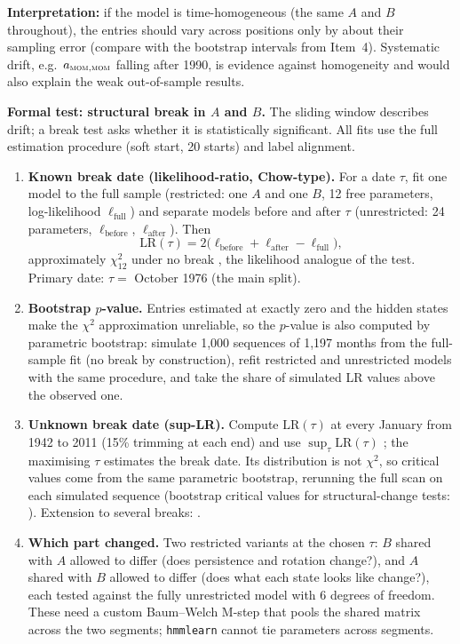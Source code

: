 \documentclass[11pt]{article}
\begin{document}
\textbf{Interpretation:} if the model is time-homogeneous (the same $A$ and $B$ throughout), the entries should vary across positions only by about their sampling error (compare with the bootstrap intervals from Item~4). Systematic drift, e.g.\ $a_{\textsc{mom},\textsc{mom}}$ falling after 1990, is evidence against homogeneity and would also explain the weak out-of-sample results.

\textbf{Formal test: structural break in $A$ and $B$.} The sliding window describes drift; a break test asks whether it is statistically significant. All fits use the full estimation procedure (soft start, 20 starts) and label alignment.
\begin{enumerate}
\item \textbf{Known break date (likelihood-ratio, Chow-type).} For a date $\tau$, fit one model to the full sample (restricted: one $A$ and one $B$, 12 free parameters, log-likelihood $\ell_{\text{full}}$) and separate models before and after $\tau$ (unrestricted: 24 parameters, $\ell_{\text{before}}$, $\ell_{\text{after}}$). Then
\[
\text{LR}(\tau)=2\big(\ell_{\text{before}}+\ell_{\text{after}}-\ell_{\text{full}}\big),
\]
approximately $\chi^2_{12}$ under no break \citep{wilks1938}, the likelihood analogue of the \citet{chow1960} test. Primary date: $\tau=$ October 1976 (the main split).
\item \textbf{Bootstrap $p$-value.} Entries estimated at exactly zero and the hidden states make the $\chi^2$ approximation unreliable, so the $p$-value is also computed by parametric bootstrap: simulate 1{,}000 sequences of 1{,}197 months from the full-sample fit (no break by construction), refit restricted and unrestricted models with the same procedure, and take the share of simulated LR values above the observed one.
\item \textbf{Unknown break date (sup-LR).} Compute $\text{LR}(\tau)$ at every January from 1942 to 2011 (15\% trimming at each end) and use $\sup_\tau\text{LR}(\tau)$ \citep{andrews1993}; the maximising $\tau$ estimates the break date. Its distribution is not $\chi^2$, so critical values come from the same parametric bootstrap, rerunning the full scan on each simulated sequence (bootstrap critical values for structural-change tests: \citealp{hansen2000}). Extension to several breaks: \citet{baiperron1998}.
\item \textbf{Which part changed.} Two restricted variants at the chosen $\tau$: $B$ shared with $A$ allowed to differ (does persistence and rotation change?), and $A$ shared with $B$ allowed to differ (does what each state looks like change?), each tested against the fully unrestricted model with 6 degrees of freedom. These need a custom Baum--Welch M-step that pools the shared matrix across the two segments; \texttt{hmmlearn} cannot tie parameters across segments.

\end{enumerate}
\end{document}
